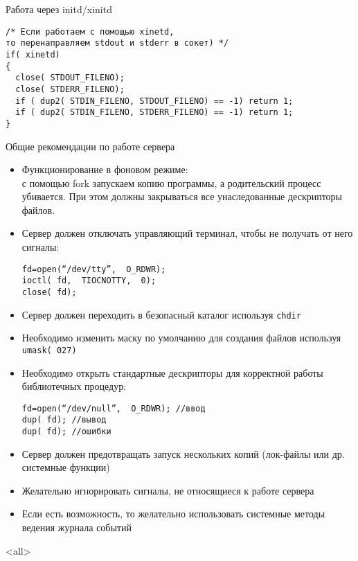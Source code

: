 \begin{frame}[fragile]{Работа через initd/xinitd}
	\scriptsize	
\begin{lstlisting}[Language=C]
/* Если работаем с помощью xinetd, 
то перенаправляем stdout и stderr в сокет) */
if( xinetd) 
{ 
  close( STDOUT_FILENO); 
  close( STDERR_FILENO); 
  if ( dup2( STDIN_FILENO, STDOUT_FILENO) == -1) return 1;
  if ( dup2( STDIN_FILENO, STDERR_FILENO) == -1) return 1;
} 
\end{lstlisting}
	\normalsize
\end{frame}

\begin{frame}[fragile]{Общие рекомендации по работе сервера}
	\scriptsize
	\begin{itemize}
		\item Функционирование в фоновом режиме:\\
			с помощью fork запускаем копию программы, а родительский процесс убивается. При этом должны закрываться все унаследованные дескрипторы файлов.
		\item Сервер должен отключать управляющий терминал,  чтобы не получать от него сигналы:\\
			\begin{verbatim}
fd=open(“/dev/tty”,  O_RDWR);
ioctl( fd,  TIOCNOTTY,  0);
close( fd);
			\end{verbatim}
		\item Сервер должен переходить в безопасный каталог используя {\tt chdir}
		\item Необходимо изменить маску по умолчанию для создания файлов используя {\tt umask( 027)}
		\item Необходимо открыть стандартные дескрипторы для корректной работы библиотечных процедур:\\
				\begin{verbatim}
fd=open(“/dev/null”,  O_RDWR); //ввод
dup( fd); //вывод
dup( fd); //ошибки
			\end{verbatim}
		\item Сервер должен предотвращать запуск нескольких копий (лок-файлы или др. системные функции)
		\item Желательно игнорировать сигналы,  не относящиеся к работе сервера
		\item Если есть возможность,  то желательно использовать системные методы ведения журнала событий
	\end{itemize}
\end{frame}

\mode<all>{}


